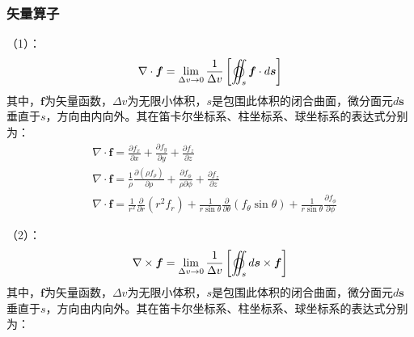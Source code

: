 \documentclass{article}
\numberwithin{equation}{section}
\renewcommand{\vec}[1]{\boldsymbol{#1}}
\begin{document}
\subsubsection{矢量算子}
（1）\textbf{\color{blue}{散度}}：
\begin{align}
    \nabla \cdot \vec{f}=\lim_{\Delta v\rightarrow 0}\frac{1}{\Delta v}\left[\varoiint_s \vec{f}\cdot d\vec{s}\right]
\end{align}
其中，$\vec{f}$为矢量函数，$\Delta v$为无限小体积，$s$是包围此体积的闭合曲面，微分面元$d\vec{s}$垂直于$s$，方向由内向外。其在笛卡尔坐标系、柱坐标系、球坐标系的表达式分别为：
\begin{align}
    &\nabla \cdot \vec{f}=\frac{\partial f_x}{\partial x}+\frac{\partial f_y}{\partial y}+\frac{\partial f_z}{\partial z} \\
    &\nabla \cdot \vec{f}=\frac{1}{\rho }\frac{\partial (\rho f_{\rho})}{\partial \rho}+\frac{\partial f_{\phi }}{\rho \partial \phi}+\frac{\partial f_z}{\partial z} \\
    &\nabla \cdot \vec{f}=\frac{1}{r^2}\frac{\partial}{\partial r}(r^2f_r)+\frac{1}{r\sin \theta}\frac{\partial}{\partial \theta}(f_{\theta}\sin \theta)+\frac{1}{r\sin \theta}\frac{\partial f_{\phi }}{\partial \phi}
\end{align}
\par
（2）\textbf{\color{blue}{旋度}}：
\begin{align}
    \nabla \times \vec{f}=\lim_{\Delta v\rightarrow 0}\frac{1}{\Delta v}\left[\varoiint_s d\vec{s}\times \vec{f}\right]
\end{align}
其中，$\vec{f}$为矢量函数，$\Delta v$为无限小体积，$s$是包围此体积的闭合曲面，微分面元$d\vec{s}$垂直于$s$，方向由内向外。其在笛卡尔坐标系、柱坐标系、球坐标系的表达式分别为：
\end{document}
